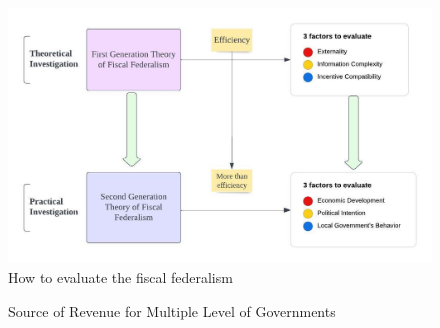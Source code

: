 \clearpage

\begin{figure}[H]
    \centering
    \includegraphics[scale=1]{Chapter-2/Figures/how to evaluate the fiscal federalism.jpeg}
    \caption[How to evaluate the fiscal federalism]{How to evaluate the fiscal federalism
        \texttt{} }
    \label{Figure 1.2}
\end{figure}

\clearpage

\begin{figure}[htbp]
    \centering
    \caption[Source of Revenue for Multiple Level of Governments in 2019]
    {Source of Revenue for Multiple Level of Governments}
    \label{sourceofreveune}
\end{figure}

